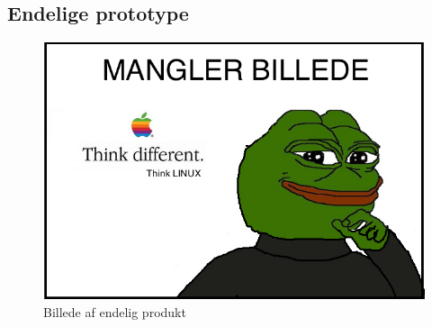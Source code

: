 \subsection{Endelige prototype}\label{subs:endeligProto}
\begin{figure}[H]
	\centering
    \includegraphics[width=13cm]{figures/stock.jpg}
	\caption{Billede af endelig produkt}
	\label{fig:endeligPrototype}
\end{figure}
